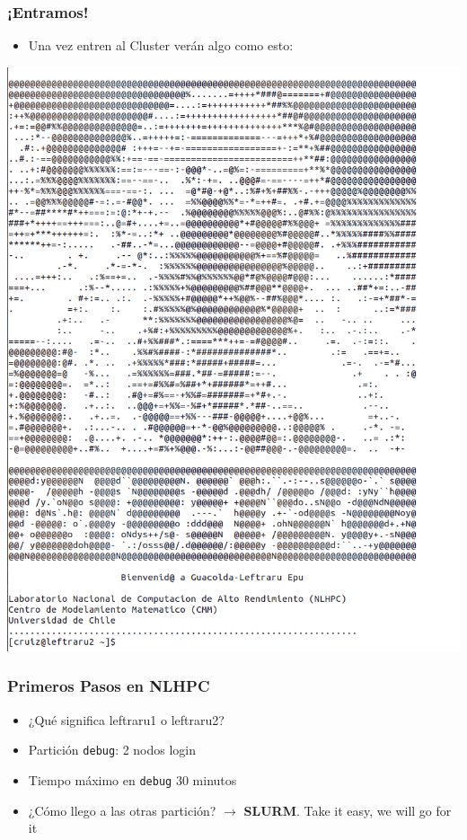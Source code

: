 \documentclass[aspectratio=169,professionalfonts]{beamer}
\begin{document}
\begin{frame}[fragile]
\frametitle{\textbf{¡Entramos!}}
\begin{itemize}
    \item Una vez entren al Cluster verán algo como esto: 
\end{itemize}
\centering
\includegraphics[scale=0.2]{FIGURES/log_in_1.png}
 \vspace{0.5em}
\end{frame}


\begin{frame}[fragile]
\frametitle{\textbf{Primeros Pasos en NLHPC}}
\begin{itemize}
    \item ¿Qué significa leftraru1 o leftraru2? 
            \vspace{0.5em} 

    \item Partición \texttt{debug}: 2 nodos login 
            \vspace{0.5em} 

    \item Tiempo máximo en \texttt{debug} 30 minutos 
            \vspace{0.5em} 

    \item ¿Cómo llego a las otras partición? $\rightarrow$ \textbf{SLURM}. Take it easy, we will go for it
\end{itemize}
    
\end{frame}
\end{document}
